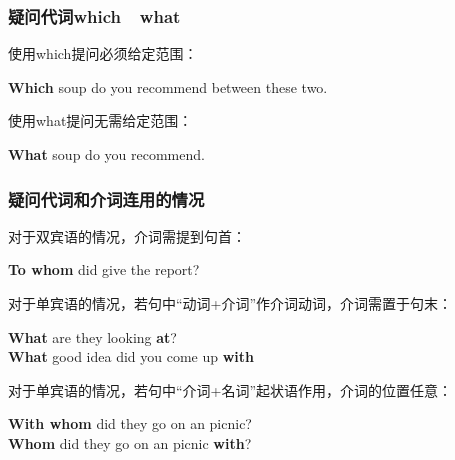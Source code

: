 \documentclass[UTF8]{ctexart}
\newcommand{\littf}[1]{{\hspace{3pt}\ttfamily #1}}
\begin{document}
\subsubsection{疑问代词\littf{which}~~\littf{what}}
    使用\littf{which}提问必须给定范围：
    \begin{center}
        \large\ttfamily
        \textbf{Which} soup do you recommend between these two.\\[4mm]
    \end{center}
    使用\littf{what\hphantom{x}}提问无需给定范围：
    \begin{center}
        \large\ttfamily
        \textbf{What} soup do you recommend.
    \end{center}

\newpage

\subsubsection{疑问代词和介词连用的情况}
    对于双宾语的情况，介词需提到句首：
    \begin{center}
        \large\ttfamily
        \textbf{To whom} did give the report?\\[6mm]
    \end{center}
    对于单宾语的情况，若句中“动词+介词”作介词动词，介词需置于句末：
    \begin{center}
        \large\ttfamily
        \textbf{What} are they looking \textbf{at}?\\[3mm]
        \textbf{What} good idea did you come up \textbf{with}\\[6mm]
    \end{center}
    对于单宾语的情况，若句中“介词+名词”起状语作用，介词的位置任意：
    \begin{center}
        \large\ttfamily
        \textbf{With whom} did they go on an picnic?\\[3mm]
        \textbf{Whom} did they go on an picnic \textbf{with}?\\[6mm]
    \end{center}\vspace{5pt}
\end{document}
